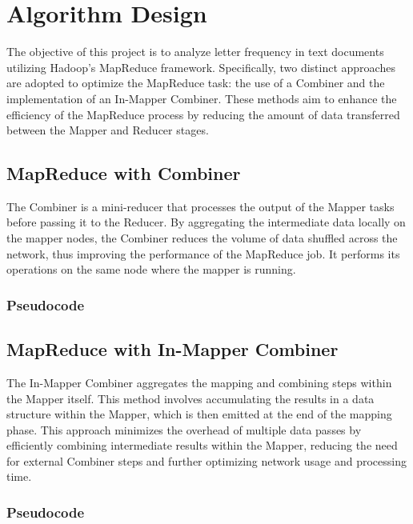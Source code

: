\newpage
\section{Algorithm Design}
The objective of this project is to analyze letter frequency in text documents utilizing Hadoop's MapReduce framework. Specifically, two distinct approaches are adopted to optimize the MapReduce task: the use of a Combiner and the implementation of an In-Mapper Combiner. These methods aim to enhance the efficiency of the MapReduce process by reducing the amount of data transferred between the Mapper and Reducer stages.

\subsection{MapReduce with Combiner}
The Combiner is a mini-reducer that processes the output of the Mapper tasks before passing it to the Reducer. By aggregating the intermediate data locally on the mapper nodes, the Combiner reduces the volume of data shuffled across the network, thus improving the performance of the MapReduce job. It performs its operations on the same node where the mapper is running.
\subsubsection{Pseudocode}


\newpage

\subsection{MapReduce with In-Mapper Combiner}
The In-Mapper Combiner aggregates the mapping and combining steps within the Mapper itself. This method involves accumulating the results in a data structure within the Mapper, which is then emitted at the end of the mapping phase. This approach minimizes the overhead of multiple data passes by efficiently combining intermediate results within the Mapper, reducing the need for external Combiner steps and further optimizing network usage and processing time.
\subsubsection{Pseudocode}

